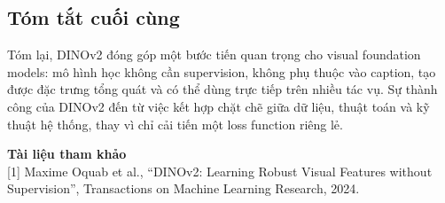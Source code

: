 \subsection{Tóm tắt cuối cùng}
Tóm lại, DINOv2 đóng góp một bước tiến quan trọng cho visual foundation models: mô hình học không cần supervision, không phụ thuộc vào caption, tạo được đặc trưng tổng quát và có thể dùng trực tiếp trên nhiều tác vụ. Sự thành công của DINOv2 đến từ việc kết hợp chặt chẽ giữa dữ liệu, thuật toán và kỹ thuật hệ thống, thay vì chỉ cải tiến một loss function riêng lẻ.

\textbf{Tài liệu tham khảo}\\
{[1]} Maxime Oquab et al., “DINOv2: Learning Robust Visual Features without Supervision”, Transactions on Machine Learning Research, 2024.
